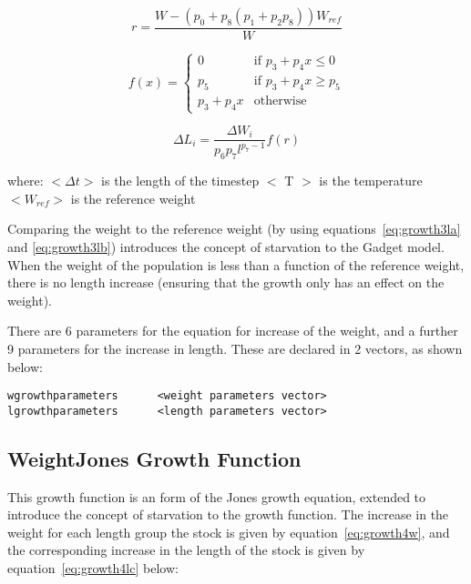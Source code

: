 \documentclass [a4paper, 10pt]{book}
\begin{document}
\begin{equation}\label{eq:growth3la}
 r = \frac{W - \left( p_{0} + p_{8} \left( p_{1} + p_{2}p_{8} \right) \right) W_{ref}}{W}
\end{equation}

\begin{equation}\label{eq:growth3lb}
f(x) =
\begin{cases}
  0
  & \textrm{if $p_{3} + p_{4}x \leq 0$} \\
  p_{5}
  & \textrm{if $p_{3} + p_{4}x \geq p_{5}$} \\
  p_{3} + p_{4}x
  & \textrm{otherwise}
\end{cases}
\end{equation}

\begin{equation}\label{eq:growth3lc}
\Delta L_{i} = \frac{\Delta W_{i}} {p_{6} p_{7} l^{p_{7} - 1}} f(r)
\end{equation}

where:\newline
$<\Delta t>$ is the length of the timestep\newline
$<$ T $>$ is the temperature\newline
$<W_{ref}>$ is the reference weight

\bigskip
Comparing the weight to the reference weight (by using equations~\ref{eq:growth3la} and \ref{eq:growth3lb}) introduces the concept of starvation to the Gadget model.  When the weight of the population is less than a function of the reference weight, there is no length increase (ensuring that the growth only has an effect on the weight).

\bigskip
There are 6 parameters for the equation for increase of the weight, and a further 9 parameters for the increase in length.  These are declared in 2 vectors, as shown below:

{\small\begin{verbatim}
wgrowthparameters      <weight parameters vector>
lgrowthparameters      <length parameters vector>
\end{verbatim}}

\subsection{WeightJones Growth Function}\label{subsec:growth4}
This growth function is an form of the Jones growth equation\footnotemark, extended to introduce the concept of starvation to the growth function.  The increase in the weight for each length group the stock is given by equation~\ref{eq:growth4w}, and the corresponding increase in the length of the stock is given by equation~\ref{eq:growth4lc} below:
\end{document}
